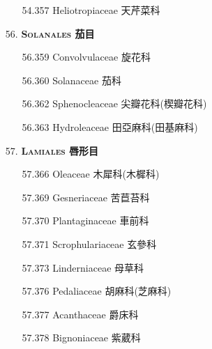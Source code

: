 \begin{enumerate}
\begin{enumerate}
      \item[54.357] Heliotropiaceae 天芹菜科     
        
    \end{enumerate}
  \item[56. ] \textbf{\textsc{Solanales} 茄目}   
    \begin{enumerate}
      \item[56.359] Convolvulaceae 旋花科     
        
      \item[56.360] Solanaceae 茄科     
        
      \item[56.362] Sphenocleaceae 尖瓣花科(楔瓣花科)     
        
      \item[56.363] Hydroleaceae 田亞麻科(田基麻科)     
        
    \end{enumerate}
  \item[57. ] \textbf{\textsc{Lamiales} 唇形目}   
    \begin{enumerate}
      \item[57.366] Oleaceae 木犀科(木樨科)     
        
      \item[57.369] Gesneriaceae 苦苣苔科     
        
      \item[57.370] Plantaginaceae 車前科     
        
      \item[57.371] Scrophulariaceae 玄參科     
        
      \item[57.373] Linderniaceae 母草科     
        
      \item[57.376] Pedaliaceae 胡麻科(芝麻科)     
        
      \item[57.377] Acanthaceae 爵床科     
        
      \item[57.378] Bignoniaceae 紫葳科     

\end{enumerate}
\end{enumerate}
